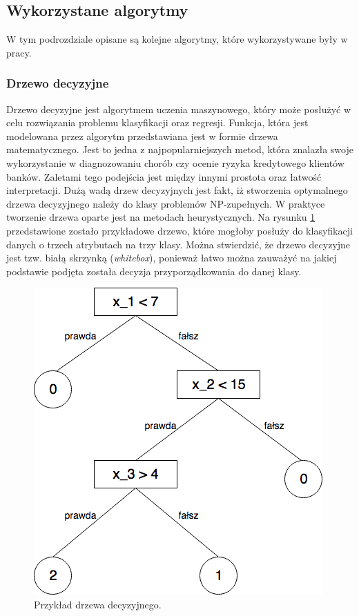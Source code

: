 \subsection{Wykorzystane algorytmy}
W tym podrozdziale opisane są kolejne algorytmy, które wykorzystywane były w pracy.
\subsubsection{Drzewo decyzyjne}
Drzewo decyzyjne jest algorytmem uczenia maszynowego, który może posłużyć w celu rozwiązania problemu klasyfikacji oraz regresji. Funkcja, która jest modelowana przez algorytm przedstawiana jest w formie drzewa matematycznego. Jest to jedna z najpopularniejszych metod, która znalazła swoje wykorzystanie w diagnozowaniu chorób czy ocenie ryzyka kredytowego klientów banków\cite{mitchel}. Zaletami tego podejścia jest między innymi  prostota oraz łatwość interpretacji. Dużą wadą drzew decyzyjnych jest fakt, iż stworzenia optymalnego drzewa decyzyjnego należy do klasy problemów NP-zupełnych. W praktyce tworzenie drzewa oparte jest na metodach heurystycznych\cite{dtscikit}. Na rysunku \ref{dt1image} przedstawione zostało przykładowe drzewo, które mogłoby posłuży do klasyfikacji danych o trzech atrybutach na trzy klasy. Można stwierdzić, że drzewo decyzyjne jest tzw. białą skrzynką (\textit{whitebox}), ponieważ łatwo można zauważyć na jakiej podstawie podjęta została decyzja przyporządkowania do danej klasy.

\begin{figure}[ht!]
\centering
\includegraphics[scale=0.6]{res/dt1.png}
\caption[Caption for LOF]{Przykład drzewa decyzyjnego.\label{dt1image}}
\end{figure} 


